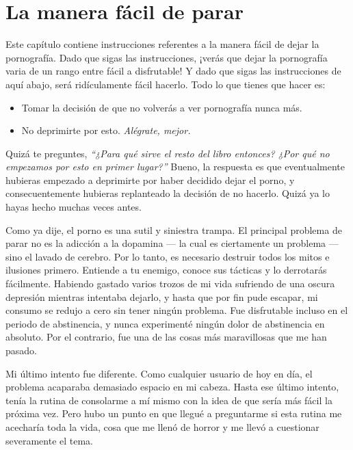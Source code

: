 \documentclass[
]{book}
\providecommand{\tightlist}{%
  \setlength{\itemsep}{0pt}\setlength{\parskip}{0pt}}
\begin{document}
\hypertarget{la-manera-fuxe1cil-de-parar}{%
\chapter{La manera fácil de parar}\label{la-manera-fuxe1cil-de-parar}}

Este capítulo contiene instrucciones referentes a la manera fácil de dejar la pornografía. Dado que sigas las instrucciones, ¡verás que dejar la pornografía varia de un rango entre fácil a disfrutable! Y dado que sigas las instrucciones de aquí abajo, será ridículamente fácil hacerlo. Todo lo que tienes que hacer es:

\begin{itemize}
\tightlist
\item
  Tomar la decisión de que no volverás a ver pornografía nunca más.
\item
  No deprimirte por esto. \emph{Alégrate, mejor.}
\end{itemize}

Quizá te preguntes, \emph{``¿Para qué sirve el resto del libro entonces? ¿Por qué no empezamos por esto en primer lugar?''} Bueno, la respuesta es que eventualmente hubieras empezado a deprimirte por haber decidido dejar el porno, y consecuentemente hubieras replanteado la decisión de no hacerlo. Quizá ya lo hayas hecho muchas veces antes.

Como ya dije, el porno es una sutil y siniestra trampa. El principal problema de parar no es la adicción a la dopamina --- la cual es ciertamente un problema --- sino el lavado de cerebro. Por lo tanto, es necesario destruir todos los mitos e ilusiones primero. Entiende a tu enemigo, conoce sus tácticas y lo derrotarás fácilmente. Habiendo gastado varios trozos de mi vida sufriendo de una oscura depresión mientras intentaba dejarlo, y hasta que por fin pude escapar, mi consumo se redujo a cero sin tener ningún problema. Fue disfrutable incluso en el periodo de abstinencia, y nunca experimenté ningún dolor de abstinencia en absoluto. Por el contrario, fue una de las cosas más maravillosas que me han pasado.

Mi último intento fue diferente. Como cualquier usuario de hoy en día, el problema acaparaba demasiado espacio en mi cabeza. Hasta ese último intento, tenía la rutina de consolarme a mí mismo con la idea de que sería más fácil la próxima vez. Pero hubo un punto en que llegué a preguntarme si esta rutina me acecharía toda la vida, cosa que me llenó de horror y me llevó a cuestionar severamente el tema.
\end{document}
